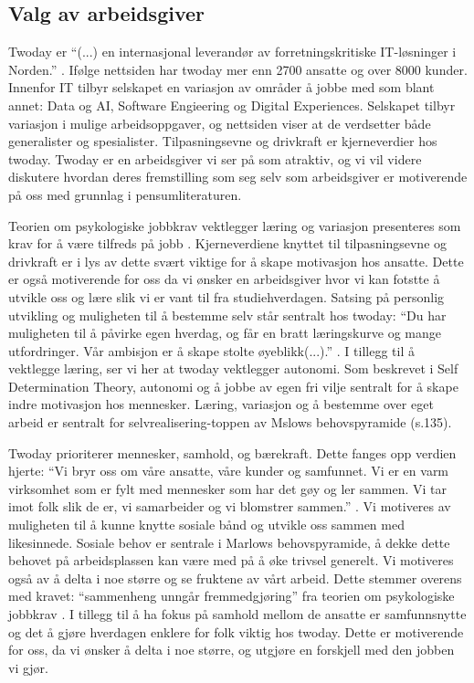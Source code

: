 \subsection{Valg av arbeidsgiver}
Twoday er \enquote{(...) en internasjonal leverandør av forretningskritiske IT-løsninger i Norden.}
\cite{twoday.no}. Ifølge nettsiden har twoday mer enn 2700 ansatte og over 8000 kunder. Innenfor IT
tilbyr selskapet en variasjon av områder å jobbe med som blant annet: Data og AI, Software Engieering
og Digital Experiences. Selskapet tilbyr variasjon i mulige arbeidsoppgaver, og nettsiden viser at de
verdsetter både generalister og spesialister. Tilpasningsevne og drivkraft er kjerneverdier hos twoday. Twoday er
en arbeidsgiver vi ser på som atraktiv, og vi vil videre diskutere hvordan deres fremstilling som seg selv som 
arbeidsgiver er motiverende på oss med grunnlag i pensumliteraturen. 

Teorien om psykologiske jobbkrav vektlegger læring og variasjon presenteres som krav for å være tilfreds på jobb \parencite[][s.120]{Teknologiledelse}. 
Kjerneverdiene knyttet til tilpasningsevne og drivkraft er i lys av dette svært viktige for å skape motivasjon hos ansatte. Dette er også motiverende for 
oss da vi ønsker en arbeidsgiver hvor vi kan fotstte å utvikle oss og lære slik vi er vant til fra studiehverdagen.
Satsing på personlig utvikling og muligheten til å bestemme selv står sentralt hos twoday: \enquote{Du har muligheten
til å påvirke egen hverdag, og får en bratt læringskurve og mange utfordringer. Vår ambisjon er å
skape stolte øyeblikk(...).} \parencite["Graduateprogrammet"]{twoday.no}. I tillegg til å vektlegge læring, ser
vi her at twoday vektlegger autonomi. Som beskrevet i Self Determination Theory\parencite[][s.121]{Teknologiledelse},
autonomi og å jobbe av egen fri vilje sentralt for å skape indre motivasjon hos mennesker. Læring,
variasjon og å bestemme over eget arbeid er sentralt for selvrealisering-toppen av Mslows
behovspyramide \parencite[][s.116]{Teknologiledelse}(s.135).

Twoday prioriterer mennesker, samhold, og bærekraft. Dette fanges opp verdien hjerte:
“Vi bryr oss om våre ansatte, våre kunder og samfunnet. Vi er en varm virksomhet som er fylt
med mennesker som har det gøy og ler sammen. Vi tar imot folk slik de er, vi samarbeider og vi
blomstrer sammen.” \parencite["Om oss"]{twoday.no}. Vi motiveres av muligheten til å kunne knytte sosiale bånd
og utvikle oss sammen med likesinnede. Sosiale behov er sentrale i Marlows behovspyramide, å dekke
dette behovet på arbeidsplassen kan være med på å øke trivsel generelt. Vi motiveres også av å delta
i noe større og se fruktene av vårt arbeid. Dette stemmer overens med kravet: “sammenheng unngår
fremmedgjøring” fra teorien om psykologiske jobbkrav \parencite[][s.120]{Teknologiledelse}. I tillegg til å ha fokus på samhold
mellom de ansatte er samfunnsnytte og det å gjøre hverdagen enklere for folk viktig hos
twoday\parencite["Graduateprogrammet"]{twoday.no}. Dette er motiverende for oss, da vi ønsker å delta i noe
større, og utgjøre en forskjell med den jobben vi gjør.

